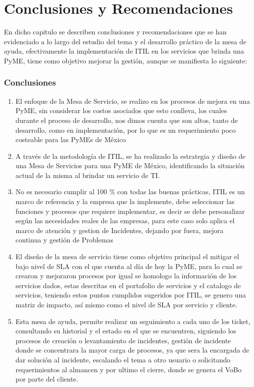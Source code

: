 \chapter{Conclusiones y Recomendaciones}

En dicho capitulo se describen conclusiones y recomendaciones que se han evidenciado
a lo largo del estudio del tema y el desarrollo práctico de la
mesa de ayuda, efectivamente la implementación de ITIL en los servicios que
brinda una PyME, tiene como objetivo mejorar la gestión, aunque se manifiesta lo siguiente:
\subsection{Conclusiones}

\begin{enumerate}[1.]
	\item El enfoque de la Mesa de Servicio, se realizo en los procesos de mejora en una PyME, sin considerar   los costos asociados que esto conlleva, los cuales durante el proceso de desarrollo, nos dimos cuenta que son altos, tanto de desarrollo, como en implementación, por lo que es un requerimiento poco costeable para las PyMEs de México
	
\item A través de la metodología de ITIL, se ha realizado la estrategia y  diseño  de una Mesa de Servicios para una  PyME de México, identificando la situación actual de la misma al brindar un servicio de TI.

\item No es necesario cumplir al 100 \% con todas las buenas prácticas, ITIL es un
marco de referencia y la empresa que la implemente, debe seleccionar las
funciones y procesos que requiere implementar, es decir se debe personalizar
según las necesidades reales de las empresas, para este caso solo aplica el marco de atención y gestion de Incidentes, dejando por fuera, mejora continua y gestión de Problemas 
\item El diseño de la mesa de servicio tiene como objetivo principal el mitigar el  bajo nivel de SLA  con el que cuenta al día de hoy la PyME, para lo cual se crearon y mejoraron procesos por igual se  homologo la información de los servicios dados, estas descritas en el portafolio de servicios y el catalogo de servicios, teniendo estos puntos cumplidos sugeridos por ITIL, se genero una matriz de impacto, así mismo como el nivel de SLA por servicio y cliente. 
\item Esta mesa de ayuda, permite realizar un seguimiento a cada uno de los
ticket, consultando su historial  y el estado en el que se encuentren, siguiendo los procesos de creación o levantamiento de incidentes, gestión de incidente donde se concentrara la mayor carga de procesos, ya que sera la encargada de dar solución al incidente, escalando el tema a otro usuario o solicitando requerimientos al almancen y por ultimo el cierre, donde se genera el VoBo por parte del cliente. 


\end{enumerate}
